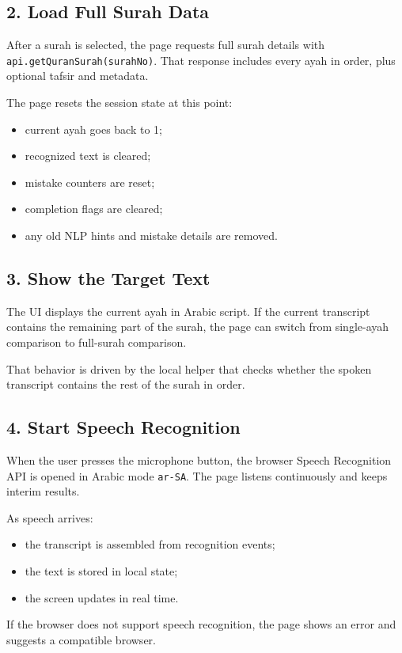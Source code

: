 \documentclass[11pt,a4paper]{article}
\begin{document}
\subsection{2. Load Full Surah Data}
After a surah is selected, the page requests full surah details with \texttt{api.getQuranSurah(surahNo)}. That response includes every ayah in order, plus optional tafsir and metadata.

The page resets the session state at this point:
\begin{itemize}
  \item current ayah goes back to 1;
  \item recognized text is cleared;
  \item mistake counters are reset;
  \item completion flags are cleared;
  \item any old NLP hints and mistake details are removed.
\end{itemize}

\subsection{3. Show the Target Text}
The UI displays the current ayah in Arabic script. If the current transcript contains the remaining part of the surah, the page can switch from single-ayah comparison to full-surah comparison.

That behavior is driven by the local helper that checks whether the spoken transcript contains the rest of the surah in order.

\subsection{4. Start Speech Recognition}
When the user presses the microphone button, the browser Speech Recognition API is opened in Arabic mode \texttt{ar-SA}. The page listens continuously and keeps interim results.

As speech arrives:
\begin{itemize}
  \item the transcript is assembled from recognition events;
  \item the text is stored in local state;
  \item the screen updates in real time.
\end{itemize}

If the browser does not support speech recognition, the page shows an error and suggests a compatible browser.
\end{document}
